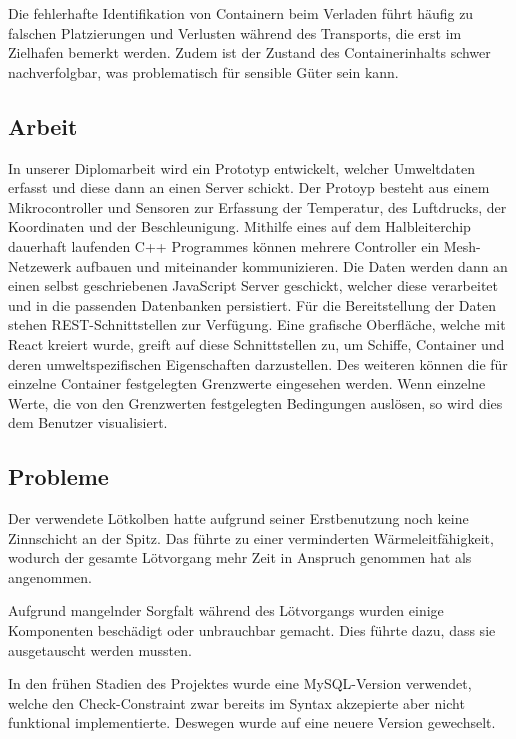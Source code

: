 \documentclass[
    headings=optiontotocandhead,%
    twoside,
    numbers=noenddot,%
    12pt, %
    titlepage, %
    parskip=full, %
    listof=leveldown, 
    numbers=noenddot, %
    a4paper,DIV=14,
    BCOR=15mm,
]{scrbook}
\begin{document}
Die fehlerhafte Identifikation von Containern beim Verladen führt häufig
zu falschen Platzierungen und Verlusten während des Transports, die erst
im Zielhafen bemerkt werden. Zudem ist der Zustand des Containerinhalts
schwer nachverfolgbar, was problematisch für sensible Güter sein kann.

\hypertarget{arbeit}{%
\subsection{Arbeit}\label{arbeit}}

In unserer Diplomarbeit wird ein Prototyp entwickelt, welcher
Umweltdaten erfasst und diese dann an einen Server schickt. Der Protoyp
besteht aus einem Mikrocontroller und Sensoren zur Erfassung der
Temperatur, des Luftdrucks, der Koordinaten und der Beschleunigung.
Mithilfe eines auf dem Halbleiterchip dauerhaft laufenden C++ Programmes
können mehrere Controller ein Mesh-Netzewerk aufbauen und miteinander
kommunizieren. Die Daten werden dann an einen selbst geschriebenen
JavaScript Server geschickt, welcher diese verarbeitet und in die
passenden Datenbanken persistiert. Für die Bereitstellung der Daten
stehen REST-Schnittstellen zur Verfügung. Eine grafische Oberfläche,
welche mit React kreiert wurde, greift auf diese Schnittstellen zu, um
Schiffe, Container und deren umweltspezifischen Eigenschaften
darzustellen. Des weiteren können die für einzelne Container
festgelegten Grenzwerte eingesehen werden. Wenn einzelne Werte, die von
den Grenzwerten festgelegten Bedingungen auslösen, so wird dies dem
Benutzer visualisiert.

\hypertarget{probleme}{%
\subsection{Probleme}\label{probleme}}

Der verwendete Lötkolben hatte aufgrund seiner Erstbenutzung noch keine
Zinnschicht an der Spitz. Das führte zu einer verminderten
Wärmeleitfähigkeit, wodurch der gesamte Lötvorgang mehr Zeit in Anspruch
genommen hat als angenommen.

Aufgrund mangelnder Sorgfalt während des Lötvorgangs wurden einige
Komponenten beschädigt oder unbrauchbar gemacht. Dies führte dazu, dass
sie ausgetauscht werden mussten.

In den frühen Stadien des Projektes wurde eine MySQL-Version verwendet,
welche den Check-Constraint zwar bereits im Syntax akzepierte aber nicht
funktional implementierte. Deswegen wurde auf eine neuere Version
gewechselt.
\end{document}
